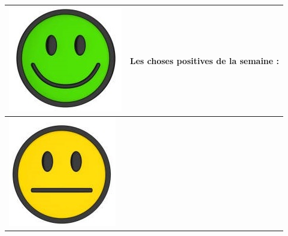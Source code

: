 \documentclass[12pt,titlepage,french]{article}
\begin{document}
\noindent\begin{tabularx}{17cm}{|p{5cm}|X|}
\hline
   \begin{minipage}{.3\textwidth}
      \includegraphics[width=\linewidth]{img/smhappy.jpg}
    \end{minipage}
    & 
    Les choses positives de la semaine :\\
\hline
     \begin{minipage}{.3\textwidth}
      \includegraphics[width=\linewidth]{img/smneutral.jpg}

\end{minipage}
\end{tabularx}
\end{document}
